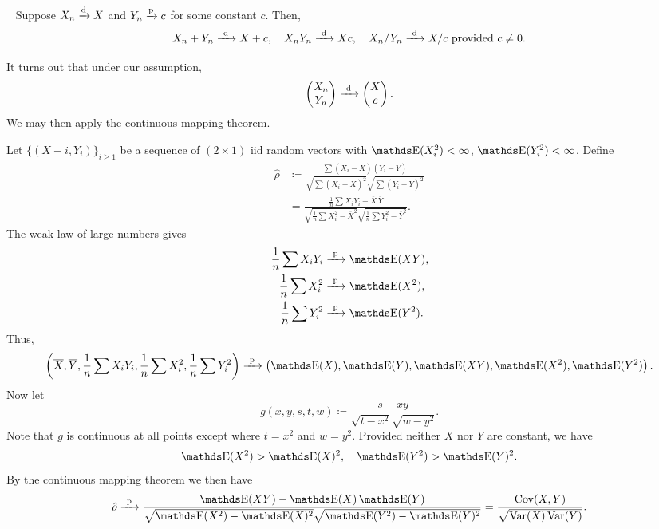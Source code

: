 \documentclass[letterpaper, 10pt]{article}
\begin{document}
\begin{theorem}~
  Suppose \(X_n \xrightarrow{\mathrm{d}} X\) and \(Y_n \xrightarrow{\mathrm{p}} c\) for some constant \(c\).
  Then,
  \[
    X_n + Y_n \xrightarrow{\ \mathrm{d}\ } X + c, \quad
    X_n Y_n \xrightarrow{\ \mathrm{d}\ } Xc, \quad
    X_n / Y_n \xrightarrow{\ \mathrm{d}\ } X / c \text{ provided } c \neq 0.
  \] 
\end{theorem}
\begin{remark}
  It turns out that under our assumption,
  \[
    \begin{pmatrix}X_n \\ Y_n\end{pmatrix} \xrightarrow{\ \mathrm{d}\ } \begin{pmatrix}X \\ c\end{pmatrix}.
  \]
  We may then apply the continuous mapping theorem.
\end{remark}
\begin{example}
  Let \(\{(X-i, Y_i)\}_{i \geq 1}\) be a sequence of \((2 \times 1)\) iid random vectors with \(\E(X_i^2) < \infty\), \(\E(Y_i^2) < \infty\).
  Define
  \begin{align*}
    \hat{\rho}
    &\coloneqq \frac{\sum (X_i - \overline{X}) (Y_i - \overline{Y})}{\sqrt{\sum (X_i - \overline{X})^2} \sqrt{\sum (Y_i - \overline{Y})^2}} \\
    &= \frac{\frac{1}{n} \sum X_i Y_i - \overline{X}\, \overline{Y}}{\sqrt{\frac{1}{n} \sum X_i^2 - \overline{X}^2} \sqrt{\frac{1}{n} \sum Y_i^2 - \overline{Y}^2}}.
  \end{align*}
  The weak law of large numbers gives
  \begin{align*}
    \frac{1}{n} \sum X_i Y_i
    &\longprobto \E(XY), \\
    \frac{1}{n} \sum X_i^2
    &\longprobto \E(X^2), \\
    \frac{1}{n} \sum Y_i^2
    &\longprobto \E(Y^2).
  \end{align*}
  Thus,
  \[
    \left( \overline{X}, \overline{Y}, \frac{1}{n} \sum X_i Y_i, \frac{1}{n} \sum X_i^2, \frac{1}{n} \sum Y_i^2 \right)
    \longprobto
    \left( \E(X), \E(Y), \E(XY), \E(X^2), \E(Y^2) \right).
  \]
  Now let
  \[
    g(x, y, s, t, w)
    \coloneqq \frac{s - xy}{\sqrt{t - x^2} \sqrt{w - y^2}}.
  \]
  Note that \(g\) is continuous at all points except where \(t = x^2\) and \(w = y^2\).
  Provided neither \(X\) nor \(Y\) are constant, we have
  \[
    \E(X^2) > \E(X)^2, \quad \E(Y^2) > \E(Y)^2.
  \]
  By the continuous mapping theorem we then have
  \[
    \hat{\rho}
    \longprobto \frac{\E(XY) - \E(X) \E(Y)}{\sqrt{\E(X^2) - \E(X)^2} \sqrt{\E(Y^2) - \E(Y)^2}}
    = \frac{\Cov(X, Y)}{\sqrt{\Var(X) \Var(Y)}}.
  \]
\end{example}
\end{document}
